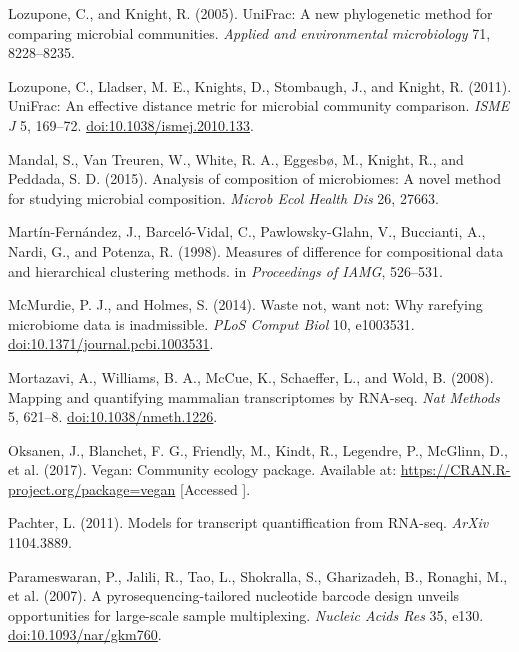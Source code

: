 \documentclass[twocolumn]{article}
\begin{document}
Lozupone, C., and Knight, R. (2005). UniFrac: A new phylogenetic method
for comparing microbial communities. \emph{Applied and environmental
microbiology} 71, 8228--8235.

Lozupone, C., Lladser, M. E., Knights, D., Stombaugh, J., and Knight, R.
(2011). UniFrac: An effective distance metric for microbial community
comparison. \emph{ISME J} 5, 169--72.
\href{http://doi.org/10.1038/ismej.2010.133}{doi:10.1038/ismej.2010.133}.

Mandal, S., Van Treuren, W., White, R. A., Eggesbø, M., Knight, R., and
Peddada, S. D. (2015). Analysis of composition of microbiomes: A novel
method for studying microbial composition. \emph{Microb Ecol Health Dis}
26, 27663.

Martín-Fernández, J., Barceló-Vidal, C., Pawlowsky-Glahn, V., Buccianti,
A., Nardi, G., and Potenza, R. (1998). Measures of difference for
compositional data and hierarchical clustering methods. in
\emph{Proceedings of IAMG}, 526--531.

McMurdie, P. J., and Holmes, S. (2014). Waste not, want not: Why
rarefying microbiome data is inadmissible. \emph{PLoS Comput Biol} 10,
e1003531.
\href{http://doi.org/10.1371/journal.pcbi.1003531}{doi:10.1371/journal.pcbi.1003531}.

Mortazavi, A., Williams, B. A., McCue, K., Schaeffer, L., and Wold, B.
(2008). Mapping and quantifying mammalian transcriptomes by RNA-seq.
\emph{Nat Methods} 5, 621--8.
\href{http://doi.org/10.1038/nmeth.1226}{doi:10.1038/nmeth.1226}.

Oksanen, J., Blanchet, F. G., Friendly, M., Kindt, R., Legendre, P.,
McGlinn, D., et al. (2017). Vegan: Community ecology package. Available
at: \url{https://CRAN.R-project.org/package=vegan} {[}Accessed {]}.

Pachter, L. (2011). Models for transcript quantiffication from RNA-seq.
\emph{ArXiv} 1104.3889.

Parameswaran, P., Jalili, R., Tao, L., Shokralla, S., Gharizadeh, B.,
Ronaghi, M., et al. (2007). A pyrosequencing-tailored nucleotide barcode
design unveils opportunities for large-scale sample multiplexing.
\emph{Nucleic Acids Res} 35, e130.
\href{http://doi.org/10.1093/nar/gkm760}{doi:10.1093/nar/gkm760}.
\end{document}
